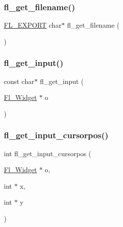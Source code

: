 \mbox{\label{forms_8_h_a38bf272c4cc02a86292714beffa2341b}} 
\subsubsection{\texorpdfstring{fl\+\_\+get\+\_\+filename()}{fl\_get\_filename()}}
{\footnotesize\ttfamily \hyperlink{_fl___export_8_h_aa9ba29a18aee9d738370a06eeb4470fc}{F\+L\+\_\+\+E\+X\+P\+O\+RT} char$\ast$ fl\+\_\+get\+\_\+filename (\begin{DoxyParamCaption}{ }\end{DoxyParamCaption})}

\mbox{\label{forms_8_h_a71d9132a3eb953a8b9f313c5d9f9ca52}} 
\subsubsection{\texorpdfstring{fl\+\_\+get\+\_\+input()}{fl\_get\_input()}}
{\footnotesize\ttfamily const char$\ast$ fl\+\_\+get\+\_\+input (\begin{DoxyParamCaption}\item[{\hyperlink{class_fl___widget}{Fl\+\_\+\+Widget} $\ast$}]{o }\end{DoxyParamCaption})\hspace{0.3cm}{\ttfamily [inline]}}

\mbox{\label{forms_8_h_af605ac3390c9bfca27322de0c6771150}} 
\subsubsection{\texorpdfstring{fl\+\_\+get\+\_\+input\+\_\+cursorpos()}{fl\_get\_input\_cursorpos()}}
{\footnotesize\ttfamily int fl\+\_\+get\+\_\+input\+\_\+cursorpos (\begin{DoxyParamCaption}\item[{\hyperlink{class_fl___widget}{Fl\+\_\+\+Widget} $\ast$}]{o,  }\item[{int $\ast$}]{x,  }\item[{int $\ast$}]{y }\end{DoxyParamCaption})\hspace{0.3cm}{\ttfamily [inline]}}

